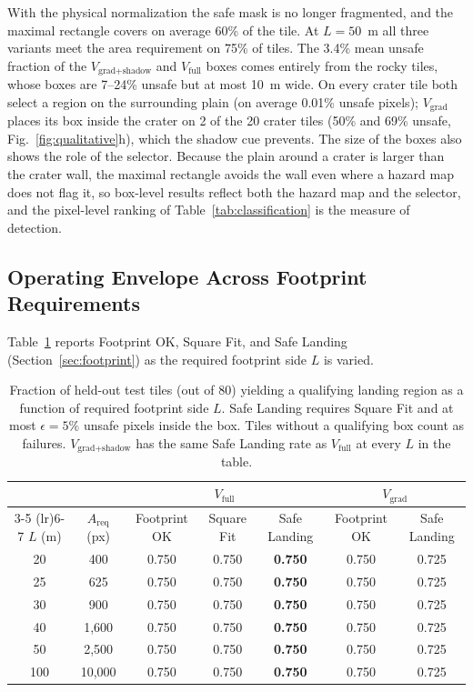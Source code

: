 \documentclass{article}
\begin{document}
With the physical normalization the safe mask is no longer fragmented, and the maximal rectangle covers on average 60\% of the tile. At $L = 50$~m all three variants meet the area requirement on 75\% of tiles. The 3.4\% mean unsafe fraction of the $V_{\text{grad+shadow}}$ and $V_{\text{full}}$ boxes comes entirely from the rocky tiles, whose boxes are 7--24\% unsafe but at most 10~m wide. On every crater tile both select a region on the surrounding plain (on average 0.01\% unsafe pixels); $V_{\text{grad}}$ places its box inside the crater on 2 of the 20 crater tiles (50\% and 69\% unsafe, Fig.~\ref{fig:qualitative}h), which the shadow cue prevents. The size of the boxes also shows the role of the selector. Because the plain around a crater is larger than the crater wall, the maximal rectangle avoids the wall even where a hazard map does not flag it, so box-level results reflect both the hazard map and the selector, and the pixel-level ranking of Table~\ref{tab:classification} is the measure of detection.

\subsection{Operating Envelope Across Footprint Requirements}
\label{sec:envelope}
Table~\ref{tab:envelope} reports Footprint OK, Square Fit, and Safe Landing (Section~\ref{sec:footprint}) as the required footprint side $L$ is varied.

\begin{table}[!htb]
  \caption{Fraction of held-out test tiles (out of 80) yielding a qualifying landing region as a function of required footprint side $L$. Safe Landing requires Square Fit and at most $\epsilon = 5\%$ unsafe pixels inside the box. Tiles without a qualifying box count as failures. $V_{\text{grad+shadow}}$ has the same Safe Landing rate as $V_{\text{full}}$ at every $L$ in the table.}
  \label{tab:envelope}
  \centering
  \small
  \setlength{\tabcolsep}{5pt}
  \begin{tabular}{cc ccc cc}
    \toprule
    & & \multicolumn{3}{c}{$V_{\text{full}}$} & \multicolumn{2}{c}{$V_{\text{grad}}$} \\
    \cmidrule(lr){3-5} \cmidrule(lr){6-7}
    $L$ (m) & $A_{\text{req}}$ (px) & Footprint OK & Square Fit & Safe Landing & Footprint OK & Safe Landing \\
    \midrule
    20 & 400   & 0.750 & 0.750 & \textbf{0.750} & 0.750 & 0.725 \\
    25 & 625   & 0.750 & 0.750 & \textbf{0.750} & 0.750 & 0.725 \\
    30 & 900   & 0.750 & 0.750 & \textbf{0.750} & 0.750 & 0.725 \\
    40 & 1,600 & 0.750 & 0.750 & \textbf{0.750} & 0.750 & 0.725 \\
    50 & 2,500 & 0.750 & 0.750 & \textbf{0.750} & 0.750 & 0.725 \\
    100 & 10,000 & 0.750 & 0.750 & \textbf{0.750} & 0.750 & 0.725 \\
    \bottomrule
  \end{tabular}
\end{table}
\end{document}
